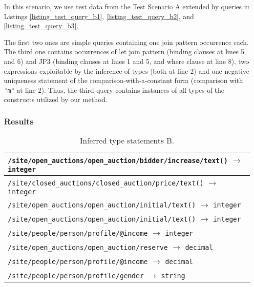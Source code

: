 In this scenario, we use test data from the Test Scenario A extended by queries in Listings \ref{listing_test_query_b1}, \ref{listing_test_query_b2}, and \ref{listing_test_query_b3}.


The first two ones are simple queries containing one join pattern occurrence each. The third one contains occurrences of let join pattern (binding clauses at lines 5 and 6) and JP3 (binding clauses at lines 1 and 5, and where clause at line 8), two expressions exploitable by the inference of types (both at line 2) and one negative uniqueness statement of the comparison-with-a-constant form (comparison with \texttt{"m"} at line 2). Thus, the third query contains instances of all types of the constructs utilized by our method.

\subsubsection{Results}

\begin{table}
\begin{tabular}{|l|}
\hline
\texttt{/site/open\_auctions/open\_auction/bidder/increase/text()} $\rightarrow$ \texttt{integer} \\ \hline
\texttt{/site/closed\_auctions/closed\_auction/price/text()} $\rightarrow$ \texttt{integer} \\ \hline
\texttt{/site/open\_auctions/open\_auction/initial/text()} $\rightarrow$ \texttt{integer} \\ \hline
\texttt{/site/open\_auctions/open\_auction/initial/text()} $\rightarrow$ \texttt{integer} \\ \hline
\texttt{/site/people/person/profile/@income} $\rightarrow$ \texttt{integer} \\ \hline
\texttt{/site/open\_auctions/open\_auction/reserve} $\rightarrow$ \texttt{decimal} \\ \hline
\texttt{/site/people/person/profile/@income} $\rightarrow$ \texttt{decimal} \\ \hline
\texttt{/site/people/person/profile/gender} $\rightarrow$ \texttt{string} \\ \hline
\end{tabular}
\caption{Inferred type statements B.}
\label{TAB_inferred_types_b}
\end{table}

